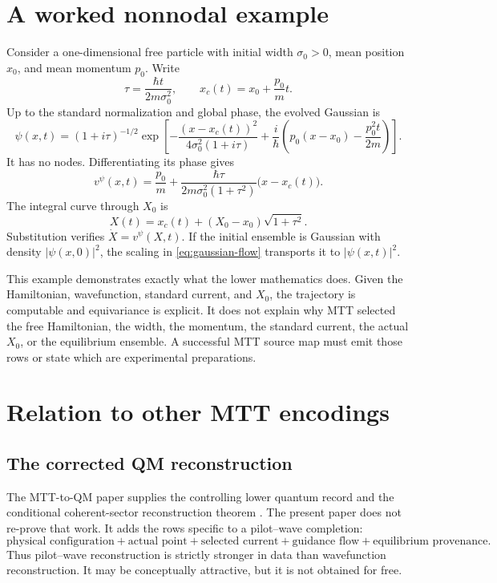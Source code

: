 \documentclass[11pt]{article}
\theoremstyle{definition}
\theoremstyle{remark}
\begin{document}
\section{A worked nonnodal example}
\label{sec:example}

Consider a one-dimensional free particle with initial width
\(\sigma_0>0\), mean position \(x_0\), and mean momentum \(p_0\).  Write
\[
\tau=\frac{\hbar t}{2m\sigma_0^2},
\qquad
x_c(t)=x_0+\frac{p_0}{m}t .
\]
Up to the standard normalization and global phase, the evolved Gaussian is
\begin{equation}
\psi(x,t)
=
(1+i\tau)^{-1/2}
\exp\!\left[
-\frac{(x-x_c(t))^2}{4\sigma_0^2(1+i\tau)}
+\frac{i}{\hbar}
\left(p_0(x-x_0)-\frac{p_0^2t}{2m}\right)
\right].
\label{eq:gaussian}
\end{equation}
It has no nodes.  Differentiating its phase gives
\begin{equation}
v^\psi(x,t)
=
\frac{p_0}{m}
+\frac{\hbar\tau}{2m\sigma_0^2(1+\tau^2)}
\bigl(x-x_c(t)\bigr).
\label{eq:gaussian-velocity}
\end{equation}
The integral curve through \(X_0\) is
\begin{equation}
X(t)
=x_c(t)+(X_0-x_0)\sqrt{1+\tau^2}.
\label{eq:gaussian-flow}
\end{equation}
Substitution verifies \(\dot X=v^\psi(X,t)\).  If the initial ensemble is
Gaussian with density \(|\psi(x,0)|^2\), the scaling in
\cref{eq:gaussian-flow} transports it to \(|\psi(x,t)|^2\).

This example demonstrates exactly what the lower mathematics does.  Given
the Hamiltonian, wavefunction, standard current, and \(X_0\), the trajectory
is computable and equivariance is explicit.  It does not explain why MTT
selected the free Hamiltonian, the width, the momentum, the standard
current, the actual \(X_0\), or the equilibrium ensemble.  A successful MTT
source map must emit those rows or state which are experimental
preparations.

\section{Relation to other MTT encodings}
\label{sec:relations}

\subsection{The corrected QM reconstruction}

The MTT-to-QM paper supplies the controlling lower quantum record and the
conditional coherent-sector reconstruction theorem \cite{MTTQM2026}.  The
present paper does not re-prove that work.  It adds the rows specific to a
pilot--wave completion:
\[
\text{physical configuration}
+\text{actual point}
+\text{selected current}
+\text{guidance flow}
+\text{equilibrium provenance}.
\]
Thus pilot--wave reconstruction is strictly stronger in data than
wavefunction reconstruction.  It may be conceptually attractive, but it is
not obtained for free.
\end{document}
